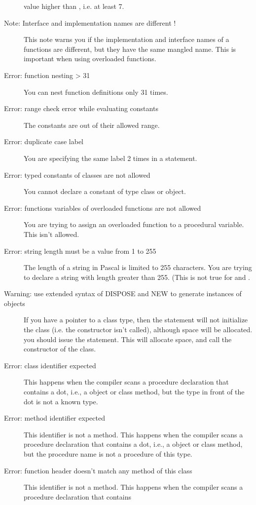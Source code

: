 \begin{description}
 value higher than , i.e. at least 7.
\item [Note: Interface and implementation names are different !]
 This note warns you if the implementation and interface names of a 
 functions are different, but they have the same mangled name. This
 is important when using overloaded functions. 
\item [Error: function nesting > 31]
 You can nest function definitions only 31 times. 
\item [Error: range check error while evaluating constants]
 The constants are out of their allowed range.
\item [Error: duplicate case label]
 You are specifying the same label 2 times in a  statement.
\item [Error: typed constants of classes are not allowed]
 You cannot declare a constant of type class or object.
\item [Error: functions variables of overloaded functions are not allowed]
 You are trying to assign an overloaded function to a procedural variable.
 This isn't allowed.
\item [Error: string length must be a value from 1 to 255]
 The length of a string in Pascal is limited to 255 characters. You are
 trying to declare a string with length greater than 255.
 (This is not true for  and .
\item [Warning: use extended syntax of DISPOSE and NEW to generate instances of objects]
 If you have a pointer  to a class type, then the statement
  will not initialize the class (i.e. the constructor isn't
 called), although space will be allocated. you should issue the
  statement. This will allocate space, and call the
 constructor of the class.
\item [Error: class identifier expected]
 This happens when the compiler scans a procedure declaration that contains 
 a dot, 
 i.e., a object or class method, but the type in front of the dot is not
 a known type.
\item [Error: method identifier expected]
 This identifier is not a method.
 This happens when the compiler scans a procedure declaration that contains 
 a dot, i.e., a object or class method, but the procedure name is not a
 procedure of this type.
\item [Error: function header doesn't match any method of this class]
 This identifier is not a method.
 This happens when the compiler scans a procedure declaration that contains 

\end{description}
